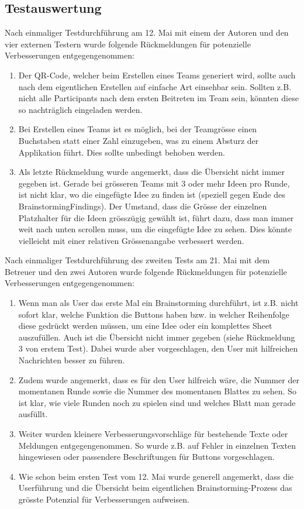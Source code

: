 \subsection{Testauswertung}
Nach einmaliger Testdurchführung am 12. Mai mit einem der Autoren und den vier externen Testern wurde folgende Rück\-mel\-dun\-gen für potenzielle Verbesserungen entgegengenommen:

\begin{enumerate}
	\item Der QR-Code, welcher beim Erstellen eines Teams generiert wird, sollte auch nach dem eigentlichen Erstellen auf einfache Art einsehbar sein. Sollten z.B. nicht alle Participants nach dem ersten Beitreten im Team sein, könnten diese so nachträglich eingeladen werden.
	\item Bei Erstellen eines Teams ist es möglich, bei der Teamgrösse einen Buchstaben statt einer Zahl einzugeben, was zu einem Absturz der Applikation führt. Dies sollte unbedingt behoben werden.
	\item Als letzte Rückmeldung wurde angemerkt, dass die Übersicht nicht immer gegeben ist. Gerade bei grösseren Teams mit 3 oder mehr Ideen pro Runde, ist nicht klar, wo die eingefügte Idee zu finden ist (speziell gegen Ende des BrainstormingFindings). Der Umstand, dass die Grösse der einzelnen Platzhalter für die Ideen grösszügig gewählt ist, führt dazu, dass man immer weit nach unten scrollen muss, um die eingefügte Idee zu sehen. Dies könnte vielleicht mit einer relativen Grössenangabe verbessert werden.
\end{enumerate}

Nach einmaliger Testdurchführung des zweiten Tests am 21. Mai mit dem Betreuer und den zwei Autoren wurde folgende Rück\-mel\-dun\-gen für potenzielle Verbesserungen entgegengenommen:

\begin{enumerate}
	\item Wenn man als User das erste Mal ein Brainstorming durchführt, ist z.B. nicht sofort klar, welche Funktion die Buttons haben bzw. in welcher Reihenfolge diese gedrückt werden müssen, um eine Idee oder ein komplettes Sheet auszufüllen. Auch ist die Übersicht nicht immer gegeben (siehe Rückmeldung 3 von erstem Test). Dabei wurde aber vorgeschlagen, den User mit hilfreichen Nachrichten besser zu führen.
	\item Zudem wurde angemerkt, dass es für den User hilfreich wäre, die Nummer der momentanen Runde sowie die Nummer des momentanen Blattes zu sehen. So ist klar, wie viele Runden noch zu spielen sind und welches Blatt man gerade ausfüllt.
	\item Weiter wurden kleinere Verbesserungsvorschläge für bestehende Texte oder Meldungen entgegengenommen. So wurde z.B. auf Fehler in einzelnen Texten hingewiesen oder passendere Beschriftungen für Buttons vorgeschlagen.
	\item  Wie schon beim ersten Test vom 12. Mai wurde generell angemerkt, dass die Userführung und die Übersicht beim eigentlichen Brainstorming-Prozess das grösste Potenzial für Verbesserungen aufweisen.
\end{enumerate}

